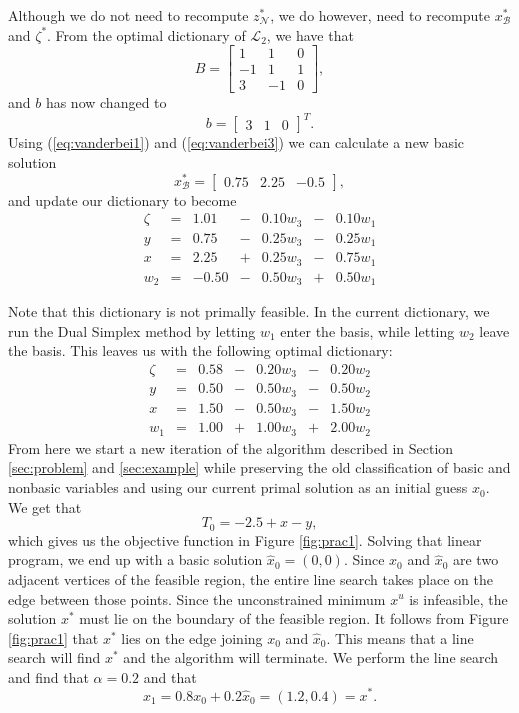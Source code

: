 Although we do not need to recompute $z_{\mathcal{N}}^*$, we do however,
need to recompute $x_{\mathcal{B}}^*$ and $\zeta^*$.
From the optimal dictionary of $\mathcal{L}_2$, we have that
\[
B = 
\left[
\begin{array}{rrr}
     1 &  1 & 0 \\
    -1 &  1 & 1 \\
     3 & -1 & 0
\end{array}
\right],
\]
and $b$ has now changed to
\[
b = \left[
\begin{array}{rrr}
    3 & 1 & 0
\end{array}
\right]^T.
\]
Using (\ref{eq:vanderbei1}) and (\ref{eq:vanderbei3}) we can calculate a new
basic solution
\[
x_{\mathcal{B}}^* =
\left[
\begin{array}{ccc}
    0.75 & 2.25 & -0.5
\end{array}
\right],
\]
and update our dictionary to become
\[
    \begin{array}{rcrcrcr}
        \zeta &=& 1.01 &-& 0.10 w_3 &-& 0.10 w_1 \\ \hline
            y &=& 0.75 &-& 0.25 w_3 &-& 0.25 w_1 \\
            x &=& 2.25 &+& 0.25 w_3 &-& 0.75 w_1 \\
          w_2 &=&-0.50 &-& 0.50 w_3 &+& 0.50 w_1
    \end{array}
\]

Note that this dictionary is not primally feasible. 
In the current dictionary, we run the Dual Simplex method by letting $w_1$
enter the basis, while letting $w_2$ leave the basis.
This leaves us with the following optimal dictionary:
\[
    \begin{array}{rcrcrcr}
        \zeta &=& 0.58 &-& 0.20 w_3 &-& 0.20 w_2 \\ \hline
            y &=& 0.50 &-& 0.50 w_3 &-& 0.50 w_2 \\
            x &=& 1.50 &-& 0.50 w_3 &-& 1.50 w_2 \\
          w_1 &=& 1.00 &+& 1.00 w_3 &+& 2.00 w_2
    \end{array}
\]
From here we start a new iteration of the algorithm described in Section
\ref{sec:problem} and \ref{sec:example} while preserving the old classification
of basic and nonbasic variables and using our current primal solution as an
initial guess $x_0$. We get that
\[
    T_0 = -2.5 + x - y,
\]
which gives us the objective function in Figure \ref{fig:prac1}. Solving that
linear program, we end up with a basic solution $\hat{x}_0 = (0,0)$.
Since $x_0$ and $\hat{x}_0$ are two adjacent vertices of the feasible region,
the entire line search takes place on the edge between those points.
Since the unconstrained minimum $x^u$ is infeasible, the solution $x^*$ must
lie on the boundary of the feasible region.
It follows from Figure \ref{fig:prac1} that $x^*$ lies on the edge joining 
$x_0$ and $\hat{x}_0$.
This means that a line search will find $x^*$ and the algorithm will terminate.
We perform the line search and find that $\alpha = 0.2$ and that
\[
    x_1 = 0.8 x_0 + 0.2 \hat{x}_0 = (1.2, 0.4) = x^*.
\]
